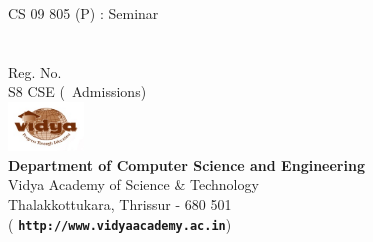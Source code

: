 %
%
\begin{titlepage}
\newcommand{\HRule}{\rule{\linewidth}{0.5mm}}
\begin{center}
{\large \sffamily CS 09 805 (P) : Seminar}\\[1cm]
{ \huge\sffamily \bfseries \vtitle}\\[5.9cm]
{\Large \sffamily \bfseries \vauthor}\\
{\large \sf  Reg. No. \vregisternumber\\ 
S8 CSE (\vadmissionyear\  Admissions)} \\[5cm] 
\includegraphics[width=0.15\textwidth]{VidyaLogo}\\[0.3cm]
{\Large \sffamily \bfseries Department of Computer Science and Engineering}\\ {\large \sffamily Vidya Academy of Science \& Technology\\ \normalsize Thalakkottukara, Thrissur - 680 501}\\
({ \bf \tt http://www.vidyaacademy.ac.in})\\[1cm]
\end{center}
\end{titlepage}
%
%